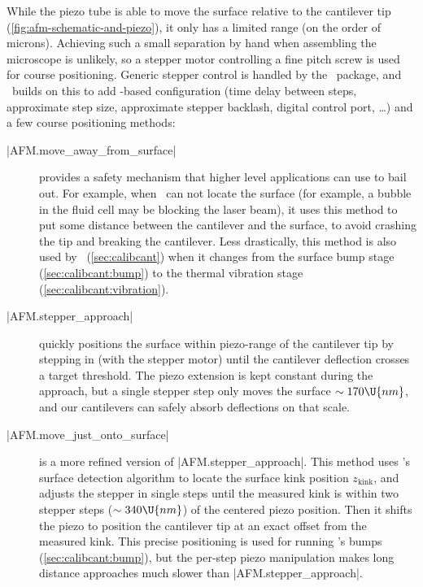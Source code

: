 While the piezo tube is able to move the surface relative to the
cantilever tip (\cref{fig:afm-schematic-and-piezo}), it only has a
limited range (on the order of microns).  Achieving such a small
separation by hand when assembling the microscope is unlikely, so a
stepper motor controlling a fine pitch screw is used for course
positioning.  Generic stepper control is handled by the
\stepper\ package, and \pyafm\ builds on this to add \hFconfig-based
configuration (time delay between steps, approximate step size,
approximate stepper backlash, digital control port, \ldots) and a few
course positioning methods:

\begin{description}
  \item[|AFM.move_away_from_surface|] provides a safety
    mechanism that higher level applications can use to bail out.  For
    example, when \unfoldprotein\ can not locate the surface (for
    example, a bubble in the fluid cell may be blocking the laser
    beam), it uses this method to put some distance between the
    cantilever and the surface, to avoid crashing the tip and breaking
    the cantilever.  Less drastically, this method is also used by
    \calibcant\ (\cref{sec:calibcant}) when it changes from the
    surface bump stage (\cref{sec:calibcant:bump}) to the thermal
    vibration stage (\cref{sec:calibcant:vibration}).
  \item[|AFM.stepper_approach|] quickly positions the
    surface within piezo-range of the cantilever tip by stepping in
    (with the stepper motor) until the cantilever deflection crosses a
    target threshold.  The piezo extension is kept constant during the
    approach, but a single stepper step only moves the surface $\sim
    170\U{nm}$, and our cantilevers can safely absorb deflections on
    that scale.
  \item[|AFM.move_just_onto_surface|] is a more refined
    version of |AFM.stepper_approach|.  This method uses
    \pypiezo's surface detection algorithm to locate the surface kink
    position $z_\text{kink}$, and adjusts the stepper in single steps
    until the measured kink is within two stepper steps ($\sim
    340\U{nm}$) of the centered piezo position.  Then it shifts the
    piezo to position the cantilever tip at an exact offset from the
    measured kink.  This precise positioning is used for running
    \calibcant's bumps (\cref{sec:calibcant:bump}), but the per-step
    piezo manipulation makes long distance approaches much slower than
    |AFM.stepper_approach|.
\end{description}

